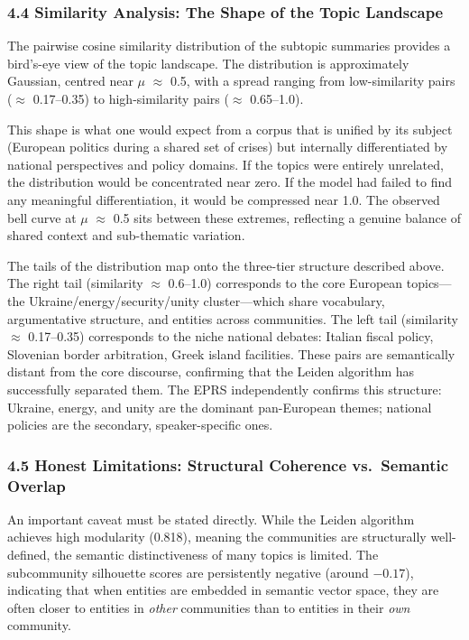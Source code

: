\documentclass[11pt]{article}
\begin{document}
\subsubsection{4.4 Similarity Analysis: The Shape of the Topic Landscape}


The pairwise cosine similarity distribution of the subtopic summaries provides a bird's-eye view of the topic landscape. The distribution is approximately Gaussian, centred near $\mu$ $\approx$ 0.5, with a spread ranging from low-similarity pairs ($\approx$ 0.17--0.35) to high-similarity pairs ($\approx$ 0.65--1.0).

This shape is what one would expect from a corpus that is unified by its subject (European politics during a shared set of crises) but internally differentiated by national perspectives and policy domains. If the topics were entirely unrelated, the distribution would be concentrated near zero. If the model had failed to find any meaningful differentiation, it would be compressed near 1.0. The observed bell curve at $\mu$ $\approx$ 0.5 sits between these extremes, reflecting a genuine balance of shared context and sub-thematic variation.

The tails of the distribution map onto the three-tier structure described above. The right tail (similarity $\approx$ 0.6--1.0) corresponds to the core European topics---the Ukraine/energy/security/unity cluster---which share vocabulary, argumentative structure, and entities across communities. The left tail (similarity $\approx$ 0.17--0.35) corresponds to the niche national debates: Italian fiscal policy, Slovenian border arbitration, Greek island facilities. These pairs are semantically distant from the core discourse, confirming that the Leiden algorithm has successfully separated them. The EPRS independently confirms this structure: Ukraine, energy, and unity are the dominant pan-European themes; national policies are the secondary, speaker-specific ones.


\subsubsection{4.5 Honest Limitations: Structural Coherence vs.\ Semantic Overlap}


An important caveat must be stated directly. While the Leiden algorithm achieves high modularity (0.818), meaning the communities are structurally well-defined, the semantic distinctiveness of many topics is limited. The subcommunity silhouette scores are persistently negative (around $-0.17$), indicating that when entities are embedded in semantic vector space, they are often closer to entities in \emph{other} communities than to entities in their \emph{own} community.
\end{document}
